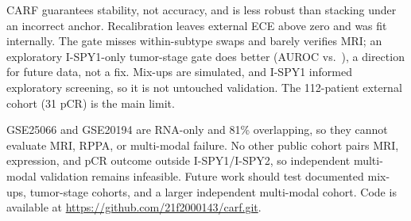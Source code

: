 \documentclass[a4paper,runningheads]{llncs}
\begin{document}
CARF guarantees stability, not accuracy, and is less robust than stacking under an incorrect anchor. Recalibration leaves external ECE above zero and was fit internally. The gate misses within-subtype swaps and barely verifies MRI; an exploratory I-SPY1-only tumor-stage gate does better (AUROC \MriTstageGateAuc{} vs.\ \GateAucMri{}), a direction for future data, not a fix. Mix-ups are simulated, and I-SPY1 informed exploratory screening, so it is not untouched validation. The 112-patient external cohort (31 pCR) is the main limit.

GSE25066 and GSE20194 are RNA-only and 81\% overlapping, so they cannot evaluate MRI, RPPA, or multi-modal failure. No other public cohort pairs MRI, expression, and pCR outcome outside I-SPY1/I-SPY2, so independent multi-modal validation remains infeasible. Future work should test documented mix-ups, tumor-stage cohorts, and a larger independent multi-modal cohort. Code is available at \url{https://github.com/21f2000143/carf.git}.


\end{document}
